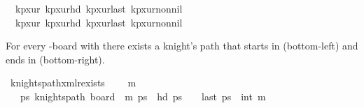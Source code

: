 \begin{isabellebody}
\ \ kp{\isacharunderscore}{\kern0pt}{}x{}{\isacharunderscore}{\kern0pt}ur\ kp{\isacharunderscore}{\kern0pt}{}x{}{\isacharunderscore}{\kern0pt}ur{\isacharunderscore}{\kern0pt}hd\ kp{\isacharunderscore}{\kern0pt}{}x{}{\isacharunderscore}{\kern0pt}ur{\isacharunderscore}{\kern0pt}last\ kp{\isacharunderscore}{\kern0pt}{}x{}{\isacharunderscore}{\kern0pt}ur{\isacharunderscore}{\kern0pt}non{\isacharunderscore}{\kern0pt}nil\isanewline
\ \ kp{\isacharunderscore}{\kern0pt}{}x{}{\isacharunderscore}{\kern0pt}ur\ kp{\isacharunderscore}{\kern0pt}{}x{}{\isacharunderscore}{\kern0pt}ur{\isacharunderscore}{\kern0pt}hd\ kp{\isacharunderscore}{\kern0pt}{}x{}{\isacharunderscore}{\kern0pt}ur{\isacharunderscore}{\kern0pt}last\ kp{\isacharunderscore}{\kern0pt}{}x{}{\isacharunderscore}{\kern0pt}ur{\isacharunderscore}{\kern0pt}non{\isacharunderscore}{\kern0pt}nil%
\begin{isamarkuptext}%
For every -board with  there exists a knight's path that starts in 
 (bottom-left) and ends in  (bottom-right).%
\end{isamarkuptext}\isamarkuptrue%
\isamarkupfalse%
\ knights{\isacharunderscore}{\kern0pt}path{\isacharunderscore}{\kern0pt}{}xm{\isacharunderscore}{\kern0pt}lr{\isacharunderscore}{\kern0pt}exists{\isacharcolon}{\kern0pt}\ \isanewline
\ \ \ {\isachardoublequoteopen}m\ {\isasymge}\ {}{\isachardoublequoteclose}\ \isanewline
\ \ \ {\isachardoublequoteopen}{\isasymexists}ps{\isachardot}{\kern0pt}\ knights{\isacharunderscore}{\kern0pt}path\ {\isacharparenleft}{\kern0pt}board\ {}\ m{\isacharparenright}{\kern0pt}\ ps\ {\isasymand}\ hd\ ps\ {\isacharequal}{\kern0pt}\ {\isacharparenleft}{\kern0pt}{}{\isacharcomma}{\kern0pt}{}{\isacharparenright}{\kern0pt}\ {\isasymand}\ last\ ps\ {\isacharequal}{\kern0pt}\ {\isacharparenleft}{\kern0pt}{}{\isacharcomma}{\kern0pt}int\ m{\isacharminus}{\kern0pt}{}{\isacharparenright}{\kern0pt}{\isachardoublequoteclose}\isanewline
%
\isadelimproof

\end{isabellebody}
